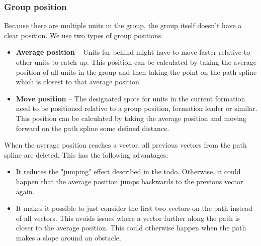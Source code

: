 \documentclass[a4paper,10pt]{article}
\begin{document}
\subsubsection{Group position}

Because there are multiple units in the group, the group itself doesn't have a clear position. We use two types of group positions.

\begin{itemize}
 \item \textbf{Average position} --
  Units far behind might have to move faster relative to other units to catch up.
  This position can be calculated by taking the average position of all units in the group and then taking the point on the path spline which is closest to that average position.
 \item \textbf{Move position} --
  The designated spots for units in the current formation need to be positioned relative to a group position, formation leader or similar.
  This position can be calculated by taking the average position and moving forward on the path spline some defined distance.
\end{itemize}


When the average position reaches a vector, all previous vectors from the path spline are deleted.
This has the following advantages:
\begin{itemize}
 \item It reduces the "jumping" effect described in the todo.
  Otherwise, it could happen that the average position jumps backwards to the previous vector again.
 \item It makes it possible to just consider the first two vectors on the path instead of all vectors.
  This avoids issues where a vector further along the path is closer to the average position.
  This could otherwise happen when the path makes a slope around an obstacle.
\end{itemize}
\end{document}
